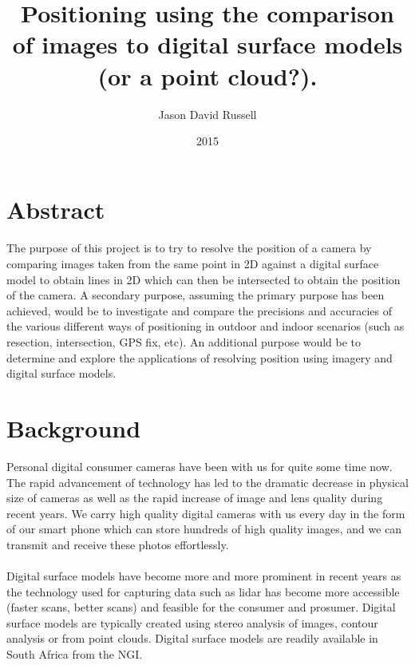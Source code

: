 \documentclass{article}
\title{Positioning using the comparison of images to digital surface models (or a point cloud?).}
\date{2015}
\author{Jason David Russell}
\begin{document}
\maketitle
{}

\newpage
\tableofcontents


\newpage
{}

\section{Abstract}
\paragraph{}
The purpose of this project is to try to resolve the position of a camera by comparing images taken from the same point in 2D against a digital surface model to obtain lines in 2D which can then be intersected to obtain the position of the camera. A secondary purpose, assuming the primary purpose has been achieved, would be to investigate and compare the precisions and accuracies of the various different ways of positioning in outdoor and indoor scenarios (such as resection, intersection, GPS fix, etc). An additional purpose would be to determine and explore the applications of resolving position using imagery and digital surface models.

\newpage

\section{Background}
Personal digital consumer cameras have been with us for quite some time now. The rapid advancement of technology has led to the dramatic decrease in physical size of cameras as well as the rapid increase of image and lens quality during recent years. We carry high quality digital cameras with us every day in the form of our smart phone which can store hundreds of high quality images, and we can transmit and receive these photos effortlessly.

\paragraph{}
Digital surface models have become more and more prominent in recent years as the technology used for capturing data such as lidar has become more accessible (faster scans, better scans) and feasible for the consumer and prosumer. Digital surface models are typically created using stereo analysis of images, contour analysis or from point clouds. Digital surface models are readily available in South Africa from the NGI.
\end{document}
